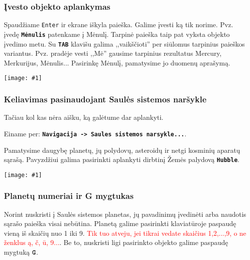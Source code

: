 \documentclass[a4paper]{article}
\newcommand{\incl}[2]{\texttt{[image: \#1]}}
\begin{document}
\subsubsection*{Įvesto objekto aplankymas}
\begin{minipage}[m]{0.6\textwidth}
Spaudžiame \texttt{Enter} ir ekrane iškyla paieška. Galime įvesti ką tik norime. Pvz. įvedę \texttt{\textbf{Mėnulis}} patenkame į Mėnulį. Tarpinė paieška taip pat vyksta objekto įvedimo metu. Su \texttt{\textbf{TAB}} klavišu galima ,,vaikščioti'' per siūlomus tarpinius paieškos variantus. Pvz. pradėje vesti ,,Mė'' gausime tarpinius rezultatus Mercury, Merkurijus, Mėnulis... Pasirinkę Mėnulį, pamatysime jo duomenų aprašymą.
\end{minipage}
\hspace{\fill}
\begin{minipage}[m]{0.3\textwidth}
\incl{menulis.jpg}{0.5}
\end{minipage}
\subsubsection*{Keliavimas pasinaudojant Saulės sistemos naršykle}
\begin{minipage}[m]{0.6\textwidth}
Tačiau kol kas nėra aišku, ką galėtume dar aplankyti.

Einame per: \texttt{\textbf{Navigacija -> Saules sistemos narsykle...}}. 

Pamatysime daugybę planetų, jų polydovų, asteroidų ir netgi kosminių aparatų sąrašą. Pavyzdžiui galima pasirinkti aplankyti dirbtinį Žemės palydovą \texttt{\textbf{Hubble}}.
\end{minipage}
\hspace{\fill}
\begin{minipage}[m]{0.3\textwidth}
\incl{hubble.jpg}{0.5}
\end{minipage}
\subsubsection*{Planetų numeriai ir G mygtukas}
Norint nuskristi į Saulės sistemos planetas, jų pavadinimų įvedinėti arba naudotis sąrašo paieška visai nebūtina. Planetą galime pasirinkti klaviatūroje paspaudę vieną iš skaičių nuo 1 iki 9.  \textcolor{red}{Tik tuo atveju, jei tikrai vedate skaičius 1,2,...,9, o ne ženklus ą, č, ū, 9...}. Be to, nuskristi ligi pasirinkto objekto galime paspaudę mygtuką $\textbf{\texttt{G}}$. 
\end{document}
